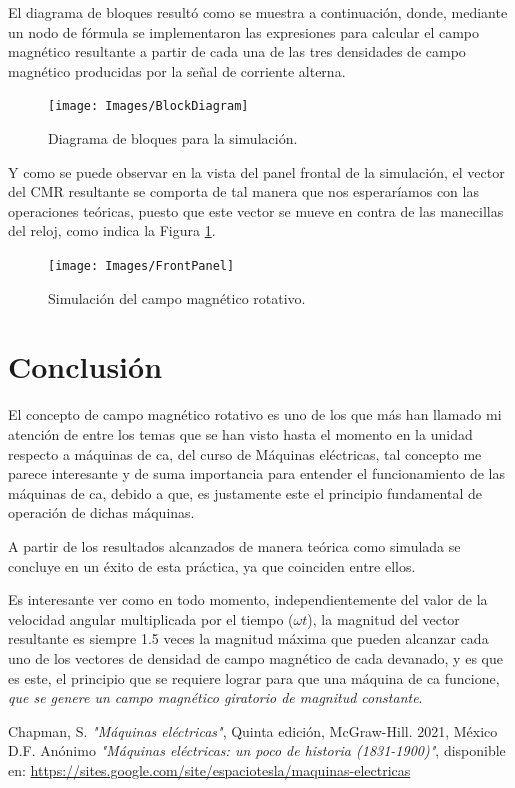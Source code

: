 \documentclass[12pt,a4paper,openany]{article}
\begin{document}
	El diagrama de bloques resultó como se muestra a continuación, donde, mediante un nodo de fórmula se implementaron las expresiones para calcular el campo magnético resultante a partir de cada una de las tres densidades de campo magnético producidas por la señal de corriente alterna.
	
	\begin{figure}[H]
		\centering
		\texttt{[image: Images/BlockDiagram]}
		\caption{Diagrama de bloques para la simulación.}
		\label{fig:blockdiagram}
	\end{figure}
	
	Y como se puede observar en la vista del panel frontal de la simulación, el vector del CMR resultante se comporta de tal manera que nos esperaríamos con las operaciones teóricas, puesto que este vector se mueve en contra de las manecillas del reloj, como indica la Figura \href{fig:campomagneticoresultante090} 1.
	
	\begin{figure}[H]
		\centering
		\texttt{[image: Images/FrontPanel]}
		\caption{Simulación del campo magnético rotativo.}
		\label{fig:frontpanel}
	\end{figure}
	
	\section{Conclusión}
	El concepto de campo magnético rotativo es uno de los que más han llamado mi atención de entre los temas que se han visto hasta el momento en la unidad respecto a máquinas de ca, del curso de Máquinas eléctricas, tal concepto me parece interesante y de suma importancia para entender el funcionamiento de las máquinas de ca, debido a que, es justamente este el principio fundamental de operación de dichas máquinas.
	
	A partir de los resultados alcanzados de manera teórica como simulada se concluye en un éxito de esta práctica, ya que coinciden entre ellos.
	
	Es interesante ver como en todo momento, independientemente del valor de la velocidad angular multiplicada por el tiempo ($\omega t$), la magnitud del vector resultante es siempre 1.5 veces la magnitud máxima que pueden alcanzar cada uno de los vectores de densidad de campo magnético de cada devanado, y es que es este, el principio que se requiere lograr para que una máquina de ca funcione, \textit{que se genere un campo magnético giratorio de magnitud constante}.
	
	\begin{thebibliography}{100}
		Chapman, S. \emph{"Máquinas eléctricas"}, Quinta edición, McGraw-Hill. 2021, México D.F.
		Anónimo \emph{"Máquinas eléctricas: un poco de historia (1831-1900)"}, disponible en: \url{https://sites.google.com/site/espaciotesla/maquinas-electricas}
	\end{thebibliography}
	
\end{document}
